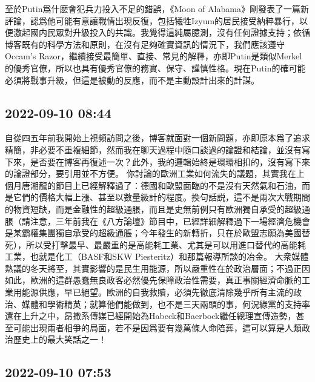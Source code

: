 \documentclass[twocolumn]{ctexart}
\begin{document}
至於Putin爲什麽會犯兵力投入不足的錯誤，《Moon of Alabama》剛發表了一篇新評論，認爲他可能有意讓戰情出現反復，包括犧牲Izyum的居民接受納粹暴行，以便激起國内民眾對升級投入的共識。我覺得這純屬臆測，沒有任何證據支持；依循博客既有的科學方法和原則，在沒有足夠確實資訊的情況下，我們應該遵守Occam's Razor，繼續接受最簡單、直接、常見的解釋，亦即Putin是類似Merkel的優秀官僚，所以也具有優秀官僚的務實、保守、謹慎性格。現在Putin的確可能必須將戰事升級，但這是被動的反應，而不是主動設計出來的計謀。
\subsection*{2022-09-10 08:44}

自從四五年前我開始上視頻訪問之後，博客就面對一個新問題，亦即原本爲了追求精簡，非必要不重複細節，然而我在聊天過程中隨口談過的論證和結論，並沒有寫下來，是否要在博客再復述一次？此外，我的邏輯始終是環環相扣的，沒有寫下來的論證部分，要引用並不方便。
你討論的歐洲工業如何流失的議題，其實我在上個月唐湘龍的節目上已經解釋過了：德國和歐盟面臨的不是沒有天然氣和石油，而是它們的價格大幅上漲、甚至以數量級計的程度。換句話説，這不是兩次大戰期間的物資短缺，而是金融性的超級通脹，而且是史無前例只有歐洲獨自承受的超級通脹（請注意，三年前我在《八方論壇》節目中，已經詳細解釋過下一場經濟危機會是某霸權集團獨自承受的超級通脹；今年發生的新轉折，只在於歐盟志願為美國替死），所以受打擊最早、最嚴重的是高能耗工業、尤其是可以用進口替代的高能耗工業，也就是化工（BASF和SKW Piesteritz）和那篇報導所談的冶金。
大衆媒體熱議的冬天將至，其實影響的是民生用能源，所以嚴重性在於政治層面；不過正因如此，歐洲的這群愚蠢無良政客必然優先保障政治性需要，真正事關經濟命脈的工業用能源供應，早已絕望。歐洲的自我救贖，必須先徹底清除幾乎所有主流的政治、媒體和學術精英；就算他們能做到，也不是三天兩頭的事，何況綠黨的支持率還在上升之中，昂撒系傳媒已經開始為Habeck和Baerbock繼任總理宣傳造勢，甚至可能出現兩者相爭的局面，若不是因爲要有幾萬條人命陪葬，這可以算是人類政治歷史上的最大笑話之一！
\subsection*{2022-09-10 07:53}
\end{document}
